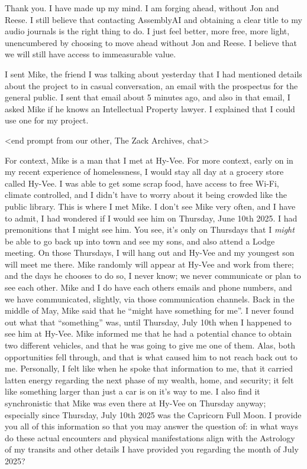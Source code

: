 \documentclass{article}
\begin{document}
Thank you. I have made up my mind. I am forging ahead, without Jon and
Reese. I still believe that contacting AssemblyAI and obtaining a clear
title to my audio journals is the right thing to do. I just feel better,
more free, more light, unencumbered by choosing to move ahead without
Jon and Reese. I believe that we will still have access to immeasurable
value.

I sent Mike, the friend I was talking about yesterday that I had
mentioned details about the project to in casual conversation, an email
with the prospectus for the general public. I sent that email about 5
minutes ago, and also in that email, I asked Mike if he knows an
Intellectual Property lawyer. I explained that I could use one for my
project.

\begin{center}
\textless end prompt from our other, The Zack Archives,
chat\textgreater{}
\end{center}

For context, Mike is a man that I met at Hy-Vee. For more context, early
on in my recent experience of homelessness, I would stay all day at a
grocery store called Hy-Vee. I was able to get some scrap food, have
access to free Wi-Fi, climate controlled, and I didn't have to worry
about it being crowded like the public library. This is where I met
Mike. I don't see Mike very often, and I have to admit, I had wondered
if I would see him on Thursday, June 10th 2025. I had premonitions that
I might see him. You see, it's only on Thursdays that I \emph{might} be
able to go back up into town and see my sons, and also attend a Lodge
meeting. On those Thursdays, I will hang out and Hy-Vee and my youngest
son will meet me there. Mike randomly will appear at Hy-Vee and work
from there; and the days he chooses to do so, I never know; we never
communicate or plan to see each other. Mike and I do have each others
emails and phone numbers, and we have communicated, slightly, via those
communication channels. Back in the middle of May, Mike said that he
``might have something for me''. I never found out what that
``something'' was, until Thursday, July 10th when I happened to see him
at Hy-Vee. Mike informed me that he had a potential chance to obtain two
different vehicles, and that he was going to give me one of them. Alas,
both opportunities fell through, and that is what caused him to not
reach back out to me. Personally, I felt like when he spoke that
information to me, that it carried latten energy regarding the next
phase of my wealth, home, and security; it felt like something larger
than just a car is on it's way to me. I also find it synchronistic that
Mike was even there at Hy-Vee on Thursday anyway; especially since
Thursday, July 10th 2025 was the Capricorn Full Moon. I provide you all
of this information so that you may answer the question of: in what ways
do these actual encounters and physical manifestations align with the
Astrology of my transits and other details I have provided you regarding
the month of July 2025?
\end{document}
